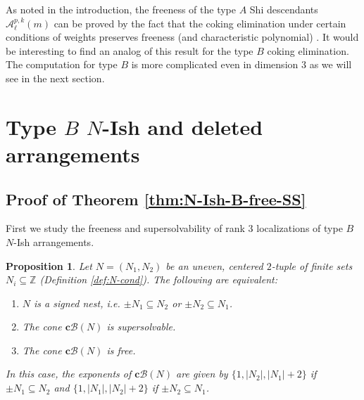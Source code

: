 \documentclass[11pt]{article}
\newtheorem{proposition}[theo]{Proposition}
\theoremstyle{definition}
\numberwithin{equation}{section}
\newcommand{\A}{\mathcal{A}}
\newcommand{\B}{\mathcal{B}}
\newcommand{\Z}{\mathbb{Z}}
\newcommand{\tbf}{\textbf}
\begin{document}
As noted in the introduction, the freeness of the type $A$ Shi descendants $\A^{p,k}_\ell(m)$ can be proved by the fact that the coking elimination under certain conditions of weights preserves freeness (and  characteristic polynomial)  \cite[Theorems 3.1 and 4.1]{ATT24}.
It would be interesting to find an analog of this result for the type $B$ coking elimination.
The computation for type $B$ is more complicated even in dimension $3$ as we will see in the next section. 
\section{Type \texorpdfstring{$B$}{B} \texorpdfstring{$N$}{N}-Ish and deleted arrangements}
\label{sec:NI-deleted}


\subsection{Proof of Theorem  \ref{thm:N-Ish-B-free-SS}}
\label{subsec:F-SS-NI}
First we study the freeness and supersolvability of rank $3$ localizations of type $B$ $N$-Ish arrangements.
\begin{proposition}
 \label{prop:N-l=2}
 Let $N = (N_1, N_2)$ be  an uneven, centered $2$-tuple  of finite sets $N_i \subseteq \Z$ (Definition \ref{def:N-cond}).
 The following are equivalent:
 \begin{enumerate}[(1)]
\item $N$ is a signed nest, i.e. $\pm N_1 \subseteq N_2$ or $\pm N_2 \subseteq N_1$.
\item  The cone $\tbf{c}\B(N)$ is supersolvable.
\item The cone $\tbf{c}\B(N)$  is  free.
\end{enumerate}
In this case, the exponents of  $\tbf{c}\B(N)$ are given by $\{1, |N_2| , |N_1| + 2\}$ if  $\pm N_1 \subseteq N_2$ and $\{1, |N_1| , |N_2| + 2\}$ if  $\pm N_2 \subseteq N_1$.
\end{proposition}
\end{document}
